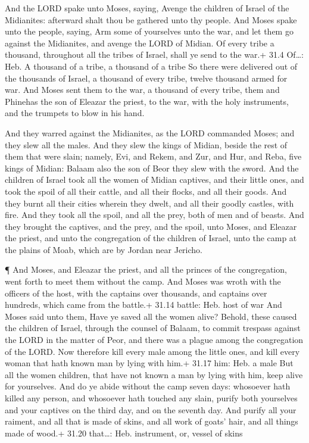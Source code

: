  And the LORD spake unto Moses, saying,  Avenge
the children of Israel of the Midianites: afterward shalt thou be
gathered unto thy people.  And Moses spake unto the people,
saying, Arm some of yourselves unto the war, and let them go against the
Midianites, and avenge the LORD of Midian.  Of every tribe a
thousand, throughout all the tribes of Israel, shall ye send to the
war.+ 31.4 Of\ldots: Heb. A thousand of a tribe, a thousand of a tribe
 So there were delivered out of the thousands of Israel, a
thousand of every tribe, twelve thousand armed for war.  And
Moses sent them to the war, a thousand of every tribe, them and Phinehas
the son of Eleazar the priest, to the war, with the holy instruments,
and the trumpets to blow in his hand.

 And they warred against the Midianites, as the LORD
commanded Moses; and they slew all the males.  And they slew
the kings of Midian, beside the rest of them that were slain; namely,
Evi, and Rekem, and Zur, and Hur, and Reba, five kings of Midian: Balaam
also the son of Beor they slew with the sword.  And the
children of Israel took all the women of Midian captives, and their
little ones, and took the spoil of all their cattle, and all their
flocks, and all their goods.  And they burnt all their
cities wherein they dwelt, and all their goodly castles, with fire.
 And they took all the spoil, and all the prey, both of men
and of beasts.  And they brought the captives, and the
prey, and the spoil, unto Moses, and Eleazar the priest, and unto the
congregation of the children of Israel, unto the camp at the plains of
Moab, which are by Jordan near Jericho.

 ¶ And Moses, and Eleazar the priest, and all the princes
of the congregation, went forth to meet them without the camp.
 And Moses was wroth with the officers of the host, with
the captains over thousands, and captains over hundreds, which came from
the battle.+ 31.14 battle: Heb. host of war  And Moses said
unto them, Have ye saved all the women alive?  Behold,
these caused the children of Israel, through the counsel of Balaam, to
commit trespass against the LORD in the matter of Peor, and there was a
plague among the congregation of the LORD.  Now therefore
kill every male among the little ones, and kill every woman that hath
known man by lying with him.+ 31.17 him: Heb. a male  But
all the women children, that have not known a man by lying with him,
keep alive for yourselves.  And do ye abide without the
camp seven days: whosoever hath killed any person, and whosoever hath
touched any slain, purify both yourselves and your captives on the third
day, and on the seventh day.  And purify all your raiment,
and all that is made of skins, and all work of goats' hair, and all
things made of wood.+ 31.20 that\ldots: Heb. instrument, or, vessel of
skins

